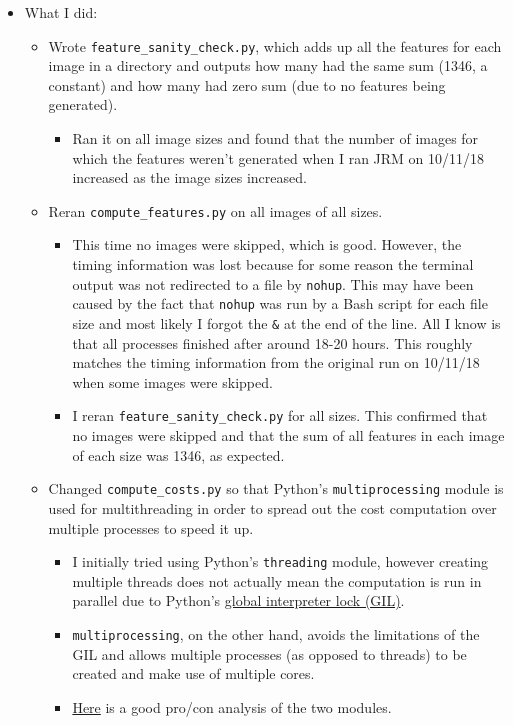 \documentclass[11pt,a4paper]{report}
\begin{document}
\begin{itemize}

\item What I did:
  \begin{itemize}
  \item Wrote \texttt{feature\_sanity\_check.py}, which adds up all the features for each image in a directory and outputs how many had the same sum (1346, a constant) and how many had zero sum (due to no features being generated).
    \begin{itemize}
    \item Ran it on all image sizes and found that the number of images for which the features weren't generated when I ran JRM on 10/11/18 increased as the image sizes increased.
    \end{itemize}

  \item Reran \texttt{compute\_features.py} on all images of all sizes.
     \begin{itemize}
     \item This time no images were skipped, which is good. However, the timing information was lost because for some reason the terminal output was not redirected to a file by \texttt{nohup}. This may have been caused by the fact that \texttt{nohup} was run by a Bash script for each file size and most likely I forgot the \texttt{\&} at the end of the line. All I know is that all processes finished after around 18-20 hours. This roughly matches the timing information from the original run on 10/11/18 when some images were skipped.
     \item I reran \texttt{feature\_sanity\_check.py} for all sizes. This confirmed that no images were skipped and that the sum of all features in each image of each size was 1346, as expected.
     \end{itemize}

  \item Changed \texttt{compute\_costs.py} so that Python's \texttt{multiprocessing} module is used for multithreading in order to spread out the cost computation over multiple processes to speed it up.
    \begin{itemize}
    \item I initially tried using Python's \texttt{threading} module, however creating multiple threads does not actually mean the computation is run in parallel due to Python's \href{https://docs.python.org/2/glossary.html\#term-global-interpreter-lock}{global interpreter lock (GIL)}.
    \item \texttt{multiprocessing}, on the other hand, avoids the limitations of the GIL and allows multiple processes (as opposed to threads) to be created and make use of multiple cores.
    \item \href{https://stackoverflow.com/a/3046201}{Here} is a good pro/con analysis of the two modules.
    \end{itemize}


\end{itemize}
\end{itemize}
\end{document}

